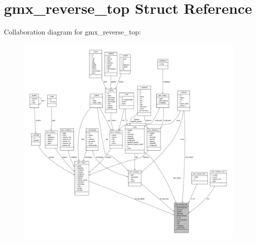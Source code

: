 \hypertarget{structgmx__reverse__top}{\section{gmx\-\_\-reverse\-\_\-top \-Struct \-Reference}
\label{structgmx__reverse__top}
}


\-Collaboration diagram for gmx\-\_\-reverse\-\_\-top\-:
\nopagebreak
\begin{figure}[H]
\begin{center}
\leavevmode
\includegraphics[width=350pt]{structgmx__reverse__top__coll__graph}
\end{center}
\end{figure}

